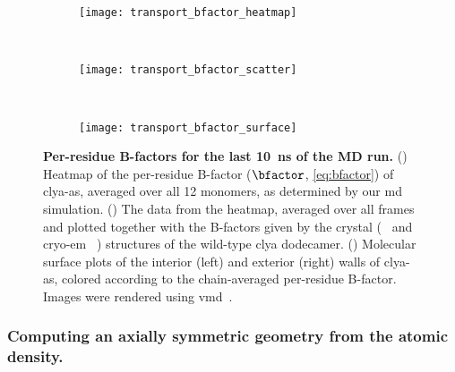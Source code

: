 %
\begin{figure*}[p]
  \centering
  
  \begin{subfigure}[t]{11.5cm}
    \centering
    \caption{}\vspace{0mm}\label{fig:transport_bfactor_heatmap}
    \texttt{[image: transport\_bfactor\_heatmap]}
  \end{subfigure}
  \\
  \begin{subfigure}[t]{11.5cm}
    \centering
    \caption{}\vspace{0mm}\label{fig:transport_bfactor_scatter}
    \texttt{[image: transport\_bfactor\_scatter]}
  \end{subfigure}
  \\
  \begin{subfigure}[t]{11.5cm}
    \centering
    \hspace{-0.5cm}
    \caption{}\vspace{0mm}\label{fig:transport_bfactor_surface}
    \texttt{[image: transport\_bfactor\_surface]}
  \end{subfigure}

  \caption[Per-residue B-factors for the last 10~ns of the {MD} run]%
  {%
    \textbf{Per-residue B-factors for the last 10~ns of the {MD} run.}
    ()
    Heatmap of the per-residue B-factor ($\bfactor$, \cref{eq:bfactor}) of \gls{clya-as}, averaged over all 12
    monomers, as determined by our \gls{md} simulation.
    ()
    The data from the heatmap, averaged over all frames and plotted together with the B-factors given by the
    crystal (~\cite{Mueller-2009} and \gls{cryo-em} ~\cite{Peng-2019}) structures of
    the wild-type \gls{clya} dodecamer.
    ()
    Molecular surface plots of the interior (left) and exterior (right) walls of \gls{clya-as}, colored
    according to the chain-averaged per-residue B-factor. Images were rendered using
    \gls{vmd}~\cite{Humphrey-1996}.
  }\label{fig:transport_bfactor}
\end{figure*}
%

\subsubsection{Computing an axially symmetric geometry from the atomic density.}
%

